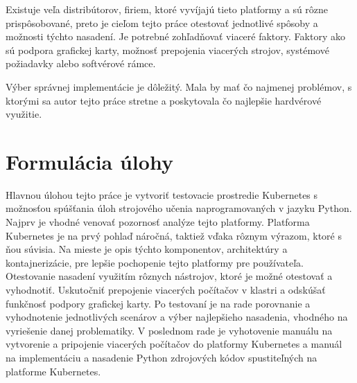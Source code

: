 Existuje veľa distribútorov, firiem, ktoré vyvíjajú tieto platformy a sú rôzne prispôsobované, preto je cieľom tejto práce otestovať jednotlivé spôsoby a možnosti týchto nasadení. Je potrebné zohľadňovať viaceré faktory. Faktory ako sú podpora grafickej karty, možnosť prepojenia viacerých strojov, systémové požiadavky alebo softvérové rámce.

Výber správnej implementácie je dôležitý. Mala by mať čo najmenej problémov, s ktorými sa autor tejto práce stretne a poskytovala čo najlepšie hardvérové využitie.

\clearpage

\section*{Formulácia úlohy}

Hlavnou úlohou tejto práce je vytvoriť testovacie prostredie Kubernetes s možnosťou spúšťania úloh strojového učenia naprogramovaných v jazyku Python. Najprv je vhodné venovať pozornosť analýze tejto platformy. Platforma Kubernetes je na prvý pohlaď náročná, taktiež vďaka rôznym výrazom, ktoré s ňou súvisia. Na mieste je opis týchto komponentov, architektúry a kontajnerizácie, pre lepšie pochopenie tejto platformy pre používateľa. Otestovanie nasadení využitím rôznych nástrojov, ktoré je možné otestovať a vyhodnotiť. Uskutočniť prepojenie viacerých počítačov v klastri a odskúšať funkčnosť podpory grafickej karty. Po testovaní je na rade porovnanie a vyhodnotenie jednotlivých scenárov a výber najlepšieho nasadenia, vhodného na vyriešenie danej problematiky. V poslednom rade je vyhotovenie manuálu na vytvorenie a pripojenie viacerých počítačov do platformy Kubernetes a manuál na implementáciu a nasadenie Python zdrojových kódov spustiteľných na platforme Kubernetes.